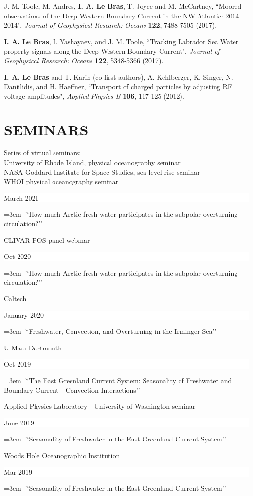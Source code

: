 \documentclass[paper=letter,fontsize=11pt]{scrartcl} %
\newcommand{\sepspace}{\vspace*{3mm}}		%
\newcommand{\NewPart}[2]{\section*{\uppercase{#1} #2}}
\newcommand{\PaperEntry}[6]{
		\noindent #1, ``#2", \textit{#3} \textbf{#4}, #5 (#6).}
\newcommand{\TalkEntry}[3]{
		\noindent #1 \hfill      %
		\colorbox{White}{%
			\parbox{6em}{%
			\hfill\color{Black}#2}} \par  %
		\noindent\hangindent=3em\hangafter=0 \textit ``#3''\sepspace} %
\begin{document}
\begin{etaremune}
\item \PaperEntry{J. M. Toole, M. Andres, \textbf{I. A. Le Bras}, T. Joyce and M. McCartney}{Moored observations of the Deep Western Boundary Current in the NW Atlantic: 2004-2014}{ Journal of Geophysical Research: Oceans}{122}{7488-7505}{2017}

\item \PaperEntry{\textbf{I. A. Le Bras}, I. Yashayaev, and J. M. Toole}{Tracking Labrador Sea Water property signals along the Deep Western Boundary Current}{ Journal of Geophysical Research: Oceans}{122}{5348-5366}{2017}

\item \PaperEntry{\textbf{I. A. Le Bras} and T. Karin (co-first authors), A. Kehlberger, K. Singer, N. Daniilidis, and H. Haeffner}{Transport of charged particles by adjusting RF voltage amplitudes}{Applied Physics B}{106}{117-125}{2012}

\end{etaremune}




\NewPart{Seminars}{}

\TalkEntry{Series of virtual seminars:\\University of Rhode Island, physical oceanography seminar\\NASA Goddard Institute for Space Studies, sea level rise seminar\\WHOI physical oceanography seminar}{March 2021}{How much Arctic fresh water participates in the subpolar overturning circulation?}

\TalkEntry{CLIVAR POS panel webinar}{Oct 2020}{How much Arctic fresh water participates in the subpolar overturning circulation?}

\TalkEntry{Caltech}{January 2020}{Freshwater, Convection, and Overturning in the Irminger Sea}

\TalkEntry{U Mass Dartmouth}{Oct 2019}{The East Greenland Current System: Seasonality of Freshwater and Boundary Current - Convection Interactions}

\TalkEntry{Applied Physics Laboratory - University of Washington seminar}{June 2019}{Seasonality of Freshwater in the East Greenland Current System}

\TalkEntry{Woods Hole Oceanographic Institution}{Mar 2019}{Seasonality of Freshwater in the East Greenland Current System}
\end{document}

